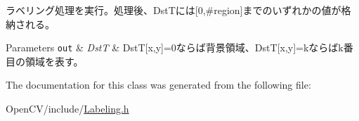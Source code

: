 ラベリング処理を実行。処理後、\+Dst\+Tには\mbox{[}0,\#region\mbox{]}までのいずれかの値が格納される。 


\begin{DoxyParams}[1]{Parameters}
\mbox{\tt out}  & {\em DstT} & DstT\mbox{[}x,y\mbox{]}=0ならば背景領域、\+DstT\mbox{[}x,y\mbox{]}=kならばk番目の領域を表す。 \\
\hline
\end{DoxyParams}


The documentation for this class was generated from the following file\+:\begin{DoxyCompactItemize}
\item 
Open\+C\+V/include/\hyperlink{_labeling_8h}{Labeling.\+h}\end{DoxyCompactItemize}
